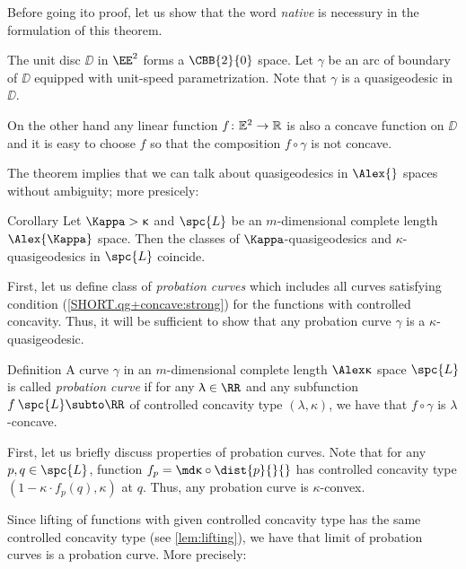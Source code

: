 Before going ito proof, let us show that the word \emph{native} is necessury in the formulation of this theorem.

The unit disc $\DD$ in $\EE^2$ forms a $\CBB{2}{0}$ space.
Let $\gamma$ be an arc of boundary of $\DD$ equipped with unit-speed parametrization.
Note that $\gamma$ is a quasigeodesic in $\DD$.

On the other hand any linear function $f\:\EE^2\to\RR$ is also a concave function on $\DD$
and
it is easy to choose $f$ so that the composition $f\circ\gamma$ is not concave.

\medskip

The theorem implies that we can talk about quasigeodesics in $\Alex{}$ spaces without ambiguity; more presicely:

\begin{thm}{Corollary}\label{qg=k-qg} 
Let $\Kappa>\kappa$ 
and $\spc{L}$ be an $m$-dimensional complete length $\Alex{\Kappa}$ space.
Then the classes of $\Kappa$-\nospace quasigeodesics and $\kappa$-\nospace quasigeodesics in $\spc{L}$ coincide.
\end{thm}


First, let us define class of \emph{probation curves} which includes all curves satisfying condition (\ref{SHORT.qg+concave:strong}) for the functions with controlled concavity.
Thus, it will be sufficient to show that any probation curve $\gamma$ is a $\kappa$-quasigeodesic.

\begin{thm}{Definition}
A curve $\gamma$ in an $m$-dimensional complete length $\Alex\kappa$ space $\spc{L}$ is called \emph{probation curve} if for any $\lambda\in \RR$ and any subfunction $f\:\spc{L}\subto\RR$ of controlled concavity type $(\lambda,\kappa)$, we have that $f\circ\gamma$ is $\lambda$-concave.
\end{thm}

First, let us briefly discuss properties of probation curves.
Note that for any $p,q\in \spc{L}$,
function $f_p=\md\kappa\circ\dist{p}{}{}$ 
has controlled concavity type $(1-\kappa\cdot  f_p(q),\kappa)$ at $q$.
Thus, any probation curve is $\kappa$-convex. 

Since lifting of functions with given controlled concavity type has the same controlled concavity type (see \ref{lem:lifting}), 
we have that limit of probation curves is a probation curve.
More precisely:


